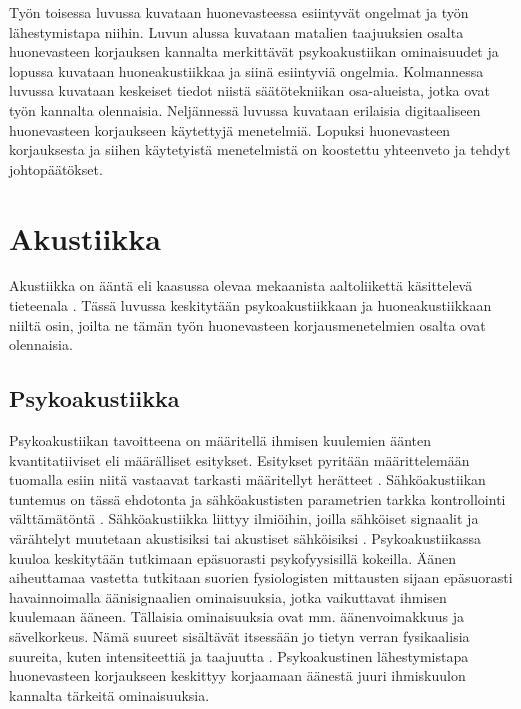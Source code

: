 \documentclass[finnish,12pt]{article}
\begin{document}
Työn toisessa luvussa kuvataan huonevasteessa esiintyvät ongelmat ja työn lähestymistapa niihin. Luvun alussa kuvataan matalien taajuuksien osalta huonevasteen korjauksen kannalta merkittävät psykoakustiikan ominaisuudet ja lopussa kuvataan huoneakustiikkaa ja siinä esiintyviä ongelmia. Kolmannessa luvussa kuvataan keskeiset tiedot niistä säätötekniikan osa-alueista, jotka ovat työn kannalta olennaisia. Neljännessä luvussa kuvataan erilaisia digitaaliseen huonevasteen korjaukseen käytettyjä menetelmiä. Lopuksi huonevasteen korjauksesta ja siihen käytetyistä menetelmistä on koostettu yhteenveto ja tehdyt johtopäätökset.


\clearpage

\section{Akustiikka}

Akustiikka on ääntä eli kaasussa olevaa mekaanista aaltoliikettä käsittelevä tieteenala \cite[luku 1]{Pierce1991}. Tässä luvussa keskitytään psykoakustiikkaan ja huoneakustiikkaan niiltä osin, joilta ne tämän työn huonevasteen korjausmenetelmien osalta ovat olennaisia.

\subsection{Psykoakustiikka}

Psykoakustiikan tavoitteena on määritellä ihmisen kuulemien äänten kvantitatiiviset eli määrälliset esitykset. Esitykset pyritään määrittelemään tuomalla esiin niitä vastaavat tarkasti määritellyt herätteet \cite{Kahrs2002}. Sähköakustiikan tuntemus on tässä ehdotonta ja sähköakustisten parametrien tarkka kontrollointi välttämätöntä \cite{Fastl1997}. Sähköakustiikka liittyy ilmiöihin, joilla sähköiset signaalit ja värähtelyt muutetaan akustisiksi tai akustiset sähköisiksi \cite{Karjalainen2002}. Psykoakustiikassa kuuloa keskitytään tutkimaan epäsuorasti psykofyysisillä kokeilla. Äänen aiheuttamaa vastetta tutkitaan suorien fysiologisten mittausten sijaan epäsuorasti havainnoimalla äänisignaalien ominaisuuksia, jotka vaikuttavat ihmisen kuulemaan ääneen. Tällaisia ominaisuuksia ovat mm. äänenvoimakkuus ja sävelkorkeus. Nämä suureet sisältävät itsessään jo tietyn verran fysikaalisia suureita, kuten intensiteettiä ja taajuutta \cite[luku 1.4]{Kahrs2002}. Psykoakustinen lähestymistapa huonevasteen korjaukseen keskittyy korjaamaan äänestä juuri ihmiskuulon kannalta tärkeitä ominaisuuksia.
\end{document}
